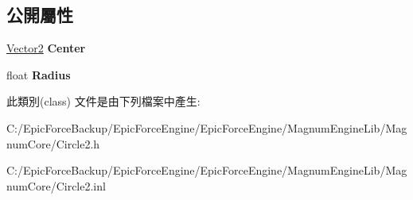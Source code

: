 \subsection*{公開屬性}
\begin{DoxyCompactItemize}
\item 
\hyperlink{class_magnum_1_1_vector2}{Vector2} {\bfseries Center}\hypertarget{class_magnum_1_1_circle2_a11b5497373828a9bd42ed211ee815316}{}\label{class_magnum_1_1_circle2_a11b5497373828a9bd42ed211ee815316}

\item 
float {\bfseries Radius}\hypertarget{class_magnum_1_1_circle2_a1a407099e3aea532a2dd16dd49c63eda}{}\label{class_magnum_1_1_circle2_a1a407099e3aea532a2dd16dd49c63eda}

\end{DoxyCompactItemize}


此類別(class) 文件是由下列檔案中產生\+:\begin{DoxyCompactItemize}
\item 
C\+:/\+Epic\+Force\+Backup/\+Epic\+Force\+Engine/\+Epic\+Force\+Engine/\+Magnum\+Engine\+Lib/\+Magnum\+Core/Circle2.\+h\item 
C\+:/\+Epic\+Force\+Backup/\+Epic\+Force\+Engine/\+Epic\+Force\+Engine/\+Magnum\+Engine\+Lib/\+Magnum\+Core/Circle2.\+inl\end{DoxyCompactItemize}
